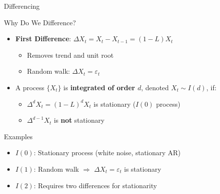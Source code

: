 \documentclass[9pt, aspectratio=169, t]{beamer}
\begin{document}
\begin{frame}{Differencing}
    \vspace{-0.3cm}
    {\small
    \begin{block}{Why Do We Difference?}
    \begin{itemize}\setlength{\itemsep}{0pt}
        \item \textbf{First Difference}: $\Delta X_t = X_t - X_{t-1} = (1 - L)X_t$
        \begin{itemize}
            \item Removes trend and unit root
            \item Random walk: $\Delta X_t = \varepsilon_t$
        \end{itemize}
    \end{itemize}
    \end{block}

    \begin{defn}
        \begin{itemize}\setlength{\itemsep}{0pt}
            \item A process $\{X_t\}$ is \textbf{integrated of order $d$}, denoted $X_t \sim I(d)$, if:
            \begin{itemize}\setlength{\itemsep}{0pt}
                \item $\Delta^d X_t = (1-L)^d X_t$ is stationary ($I(0)$ process)
                \item $\Delta^{d-1} X_t$ is \textbf{not} stationary
            \end{itemize}
        \end{itemize}
    \end{defn}

    \begin{exampleblock}{Examples}
    \begin{itemize}\setlength{\itemsep}{0pt}
        \item $I(0)$: Stationary process (white noise, stationary AR)
        \item $I(1)$: Random walk $\Rightarrow$ $\Delta X_t = \varepsilon_t$ is stationary
        \item $I(2)$: Requires two differences for stationarity
    \end{itemize}
    \end{exampleblock}
    }
\end{frame}

\end{document}

